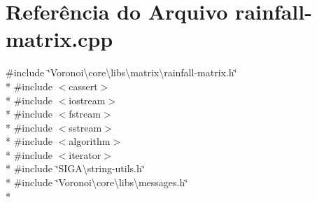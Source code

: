 \section{Referência do Arquivo rainfall-\/matrix.cpp}
\label{rainfall-matrix_8cpp}
{\ttfamily \#include \char`\"{}Voronoi\textbackslash{}core\textbackslash{}libs\textbackslash{}matrix\textbackslash{}rainfall-\/matrix.\+h\char`\"{}}\\*
{\ttfamily \#include $<$cassert$>$}\\*
{\ttfamily \#include $<$iostream$>$}\\*
{\ttfamily \#include $<$fstream$>$}\\*
{\ttfamily \#include $<$sstream$>$}\\*
{\ttfamily \#include $<$algorithm$>$}\\*
{\ttfamily \#include $<$iterator$>$}\\*
{\ttfamily \#include \char`\"{}S\+I\+G\+A\textbackslash{}string-\/utils.\+h\char`\"{}}\\*
{\ttfamily \#include \char`\"{}Voronoi\textbackslash{}core\textbackslash{}libs\textbackslash{}messages.\+h\char`\"{}}\\*
